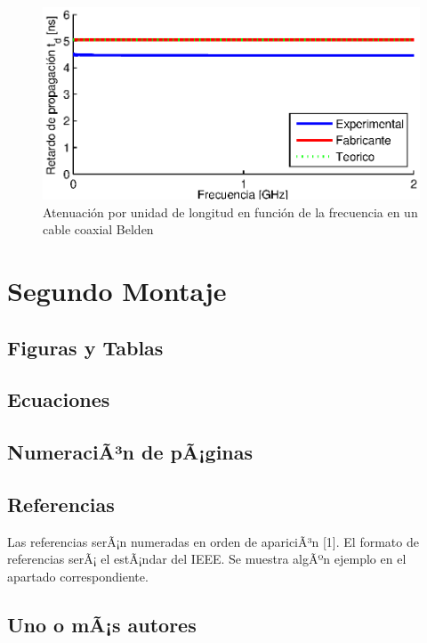\documentclass[10pt,conference,a4paper]{IEEEtran}
\begin{document}
\begin{figure}[htb]
    \centering
    \includegraphics[width=\columnwidth]{figuras/retardo.eps}
    \caption{Atenuación por unidad de longitud en función de la frecuencia en un cable coaxial Belden}
    \label{fig:retardo_coaxial}
\end{figure}

\section{Segundo Montaje}

\subsection{Figuras y Tablas}


\subsection{Ecuaciones}

\subsection{NumeraciÃ³n de pÃ¡ginas}

\subsection{Referencias}

Las referencias serÃ¡n numeradas en orden de apariciÃ³n [1]. El formato de
referencias serÃ¡ el estÃ¡ndar del IEEE. Se muestra algÃºn ejemplo en el apartado correspondiente.

\subsection{Uno o mÃ¡s autores}
\end{document}
